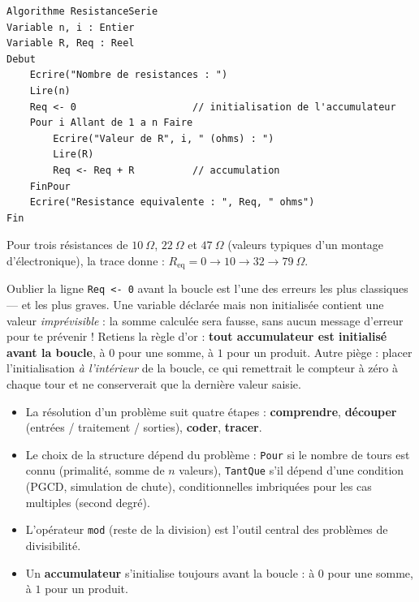 \documentclass[11pt]{article}
\begin{document}
\begin{lstlisting}
Algorithme ResistanceSerie
Variable n, i : Entier
Variable R, Req : Reel
Debut
    Ecrire("Nombre de resistances : ")
    Lire(n)
    Req <- 0                    // initialisation de l'accumulateur
    Pour i Allant de 1 a n Faire
        Ecrire("Valeur de R", i, " (ohms) : ")
        Lire(R)
        Req <- Req + R          // accumulation
    FinPour
    Ecrire("Resistance equivalente : ", Req, " ohms")
Fin
\end{lstlisting}

Pour trois résistances de $10\ \Omega$, $22\ \Omega$ et $47\ \Omega$ (valeurs typiques d'un montage d'électronique), la trace donne : $R_{\text{eq}} = 0 \to 10 \to 32 \to 79\ \Omega$.

\begin{attention}
Oublier la ligne \texttt{Req <- 0} avant la boucle est l'une des erreurs les plus classiques — et les plus graves. Une variable déclarée mais non initialisée contient une valeur \emph{imprévisible} : la somme calculée sera fausse, sans aucun message d'erreur pour te prévenir ! Retiens la règle d'or : \textbf{tout accumulateur est initialisé avant la boucle}, à $0$ pour une somme, à $1$ pour un produit. Autre piège : placer l'initialisation \emph{à l'intérieur} de la boucle, ce qui remettrait le compteur à zéro à chaque tour et ne conserverait que la dernière valeur saisie.
\end{attention}

\begin{aretenir}
\begin{itemize}
\item La résolution d'un problème suit quatre étapes : \textbf{comprendre}, \textbf{découper} (entrées / traitement / sorties), \textbf{coder}, \textbf{tracer}.
\item Le choix de la structure dépend du problème : \texttt{Pour} si le nombre de tours est connu (primalité, somme de $n$ valeurs), \texttt{TantQue} s'il dépend d'une condition (PGCD, simulation de chute), conditionnelles imbriquées pour les cas multiples (second degré).
\item L'opérateur \texttt{mod} (reste de la division) est l'outil central des problèmes de divisibilité.
\item Un \textbf{accumulateur} s'initialise toujours avant la boucle : à $0$ pour une somme, à $1$ pour un produit.
\end{itemize}
\end{aretenir}
\end{document}
